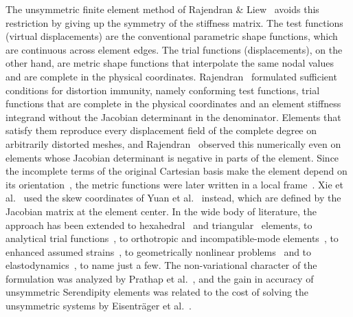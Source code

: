 The unsymmetric finite element method of Rajendran \& Liew~\cite{Rajendran2003novel} avoids this restriction by giving up the symmetry of the stiffness matrix. The test functions (virtual displacements) are the conventional parametric shape functions, which are continuous across element edges. The trial functions (displacements), on the other hand, are metric shape functions that interpolate the same nodal values and are complete in the physical coordinates. Rajendran~\cite{Rajendran2010technique} formulated sufficient conditions for distortion immunity, namely conforming test functions, trial functions that are complete in the physical coordinates and an element stiffness integrand without the Jacobian determinant in the denominator. Elements that satisfy them reproduce every displacement field of the complete degree on arbitrarily distorted meshes, and Rajendran~\cite{Rajendran2010technique} observed this numerically even on elements whose Jacobian determinant is negative in parts of the element. Since the incomplete terms of the original Cartesian basis make the element depend on its orientation~\cite{Ooi2008Remedies}, the metric functions were later written in a local frame~\cite{Ooi2008Remedies,Cowan2014Rotationally}. Xie et al.~\cite{Xie2016Modified} used the skew coordinates of Yuan et al.~\cite{Yuan1993New} instead, which are defined by the Jacobian matrix at the element center. In the wide body of literature, the approach has been extended to hexahedral~\cite{Ooi2004hexahedron} and triangular~\cite{Liew2006quadratic} elements, to analytical trial functions~\cite{Cen2012shape,Cen2015unsymmetric,Cen2019Some}, to orthotropic and incompatible-mode elements~\cite{Shang2018airy,Huang2022Unsymmetric}, to enhanced assumed strains~\cite{Pfefferkorn2021mesh,Pfefferkorn2023hourglassing}, to geometrically nonlinear problems~\cite{Ooi2007extension,Li2018high} and to elastodynamics~\cite{Wang2022Temporal,Zaehringer2026On}, to name just a few. The non-variational character of the formulation was analyzed by Prathap et al.~\cite{Prathap2006mesh,Prathap2007The}, and the gain in accuracy of unsymmetric Serendipity elements was related to the cost of solving the unsymmetric systems by Eisentr\"ager et al.~\cite{Eisentraeger2025unsymmetric}.

